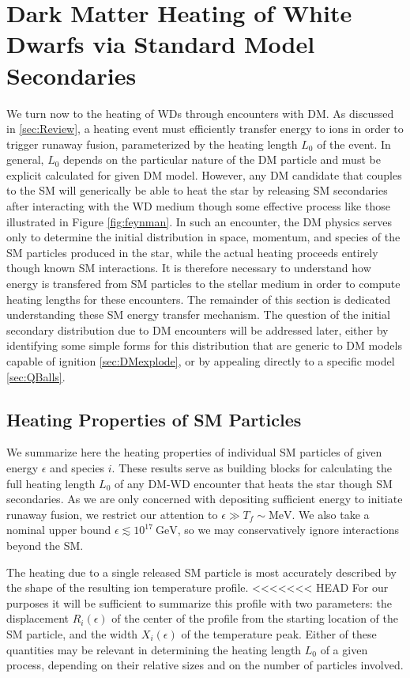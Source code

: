 \documentclass[twocolumn,showpacs,preprintnumbers,amsmath,amssymb,prd]{revtex4}
\newcommand{\GeV}{\text{GeV}}
\begin{document}
\section{Dark Matter Heating of White Dwarfs via Standard Model Secondaries}
\label{sec:SMHeating}

We turn now to the heating of WDs through encounters with DM. 
As discussed in \ref{sec:Review}, a heating event must efficiently transfer energy to ions in order to trigger runaway fusion, parameterized by the heating length $L_0$ of the event. 
In general, $L_0$ depends on the particular nature of the DM particle and must be explicit calculated for given DM model. 
However, any DM candidate that couples to the SM will generically be able to heat the star by releasing SM secondaries after interacting with the WD medium though some effective process like those illustrated in Figure \ref{fig:feynman}.
In such an encounter, the DM physics serves only to determine the initial distribution in space, momentum, and species of the SM particles produced in the star, while the actual heating proceeds entirely though known SM interactions. 
It is therefore necessary to understand how energy is transfered from SM particles to the stellar medium in order to compute heating lengths for these encounters.
The remainder of this section is dedicated understanding these SM energy transfer mechanism. 
The question of the initial secondary distribution due to DM encounters will be addressed later, either by identifying some simple forms for this distribution that are generic to DM models capable of ignition \ref{sec:DMexplode}, or by appealing directly to a specific model \ref{sec:QBalls}.

\subsection{Heating Properties of SM Particles}

We summarize here the heating properties of individual SM particles of given energy $\epsilon$ and species $i$. 
These results serve as building blocks for calculating the full heating length $L_0$ of any DM-WD encounter that heats the star though SM secondaries.
As we are only concerned with depositing sufficient energy to initiate runaway fusion, we restrict our attention to $\epsilon \gg T_f \sim \text{MeV}$.
We also take a nominal upper bound $\epsilon \lesssim 10^{17} ~\GeV$, so we may conservatively ignore interactions beyond the SM. 

The heating due to a single released SM particle is most accurately described by the shape of the resulting ion temperature profile.
<<<<<<< HEAD
For our purposes it will be sufficient to summarize this profile with two parameters: the displacement $R_i(\epsilon)$ of the center of the profile from the starting location of the SM particle, and the width $X_i(\epsilon)$ of the temperature peak. 
Either of these quantities may be relevant in determining the heating length $L_0$ of a given process, depending on their relative sizes and on the number of particles involved.
\end{document}
